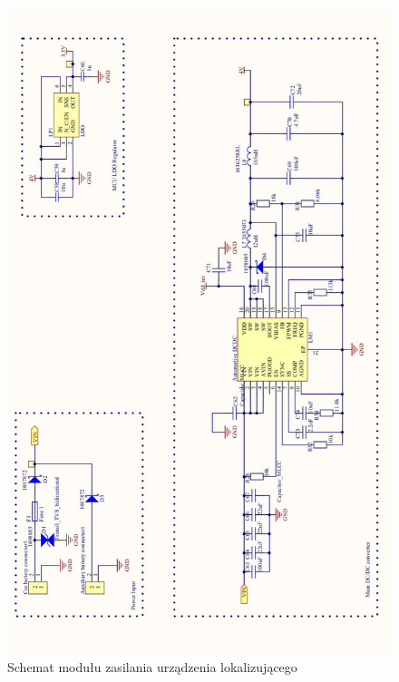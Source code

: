 \begin{figure}[H]
	\centering
	\includegraphics[width=14cm]{img/schematics/mainboard_power.jpg}
	\caption{Schemat modułu zasilania urządzenia lokalizującego}
	\label{fig:image_mainboard_power_schematic}
\end{figure}

